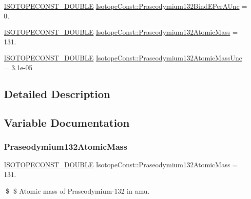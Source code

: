 \begin{DoxyCompactItemize}
\item 
\mbox{\hyperlink{group___isotope_const-_macros_ga8f45a7272ce02c0b4c65c44636ed719a}{I\+S\+O\+T\+O\+P\+E\+C\+O\+N\+S\+T\+\_\+\+D\+O\+U\+B\+LE}} \mbox{\hyperlink{group___isotope_const-_praseodymium-_pr132_gae4342e72a0a3789e9cae47b588c22f34}{Isotope\+Const\+::\+Praseodymium132\+Bind\+E\+Per\+A\+Unc}} = 0.
\item 
\mbox{\hyperlink{group___isotope_const-_macros_ga8f45a7272ce02c0b4c65c44636ed719a}{I\+S\+O\+T\+O\+P\+E\+C\+O\+N\+S\+T\+\_\+\+D\+O\+U\+B\+LE}} \mbox{\hyperlink{group___isotope_const-_praseodymium-_pr132_ga49bf501f596c682499286bf6d10580af}{Isotope\+Const\+::\+Praseodymium132\+Atomic\+Mass}} = 131.
\item 
\mbox{\hyperlink{group___isotope_const-_macros_ga8f45a7272ce02c0b4c65c44636ed719a}{I\+S\+O\+T\+O\+P\+E\+C\+O\+N\+S\+T\+\_\+\+D\+O\+U\+B\+LE}} \mbox{\hyperlink{group___isotope_const-_praseodymium-_pr132_gaf6d5872bc34ae65b168e697f67b27710}{Isotope\+Const\+::\+Praseodymium132\+Atomic\+Mass\+Unc}} = 3.\+1e-\/05
\end{DoxyCompactItemize}


\subsection{Detailed Description}


\subsection{Variable Documentation}
\mbox{\label{group___isotope_const-_praseodymium-_pr132_ga49bf501f596c682499286bf6d10580af}} 
\subsubsection{\texorpdfstring{Praseodymium132\+Atomic\+Mass}{Praseodymium132AtomicMass}}
{\footnotesize\ttfamily \mbox{\hyperlink{group___isotope_const-_macros_ga8f45a7272ce02c0b4c65c44636ed719a}{I\+S\+O\+T\+O\+P\+E\+C\+O\+N\+S\+T\+\_\+\+D\+O\+U\+B\+LE}} Isotope\+Const\+::\+Praseodymium132\+Atomic\+Mass = 131.}

\$ \$ Atomic mass of Praseodymium-\/132 in amu. \mbox{\label{group___isotope_const-_praseodymium-_pr132_gaf6d5872bc34ae65b168e697f67b27710}} 

